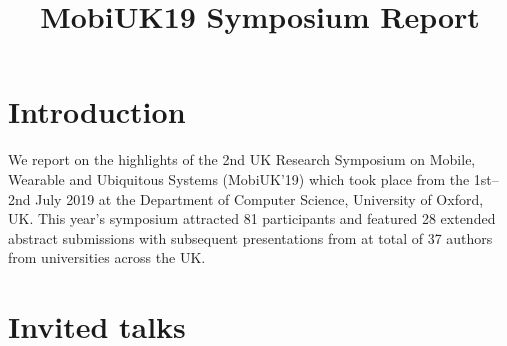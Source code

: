 \documentclass[conference]{IEEEtran}
\begin{document}
\title{MobiUK19 Symposium Report}


\author{
\and
{}
\and
{}
}

\maketitle



\section{Introduction}
We report on the highlights of the 2nd UK Research Symposium on Mobile, Wearable and Ubiquitous Systems (MobiUK’19) which took place from the 1st–2nd July 2019 at the Department of Computer Science, University of Oxford, UK. This year’s symposium attracted 81 participants and featured 28 extended abstract submissions with subsequent presentations from at total of 37 authors from universities across the UK. 

\section{Invited talks}
\end{document}
